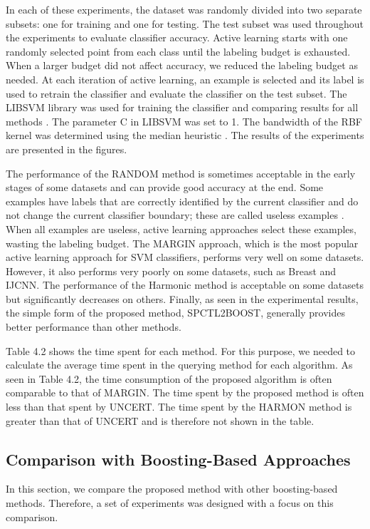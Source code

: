\documentclass[12pt]{article}
\begin{document}
	In each of these experiments, the dataset was randomly divided into two separate subsets: one for training and one for testing. The test subset was used throughout the experiments to evaluate classifier accuracy. Active learning starts with one randomly selected point from each class until the labeling budget is exhausted. When a larger budget did not affect accuracy, we reduced the labeling budget as needed. At each iteration of active learning, an example is selected and its label is used to retrain the classifier and evaluate the classifier on the test subset. The LIBSVM library was used for training the classifier and comparing results for all methods \cite{chang2011libsvm}. The parameter C in LIBSVM was set to 1. The bandwidth of the RBF kernel was determined using the median heuristic \cite{gretton2012kernel}. The results of the experiments are presented in the figures.
	
	The performance of the RANDOM method is sometimes acceptable in the early stages of some datasets and can provide good accuracy at the end. Some examples have labels that are correctly identified by the current classifier and do not change the current classifier boundary; these are called useless examples \cite{hospedales2010finding}. When all examples are useless, active learning approaches select these examples, wasting the labeling budget. The MARGIN approach, which is the most popular active learning approach for SVM classifiers, performs very well on some datasets. However, it also performs very poorly on some datasets, such as Breast and IJCNN. The performance of the Harmonic method is acceptable on some datasets but significantly decreases on others. Finally, as seen in the experimental results, the simple form of the proposed method, SPCTL2BOOST, generally provides better performance than other methods.
	
	Table 4.2 shows the time spent for each method. For this purpose, we needed to calculate the average time spent in the querying method for each algorithm. As seen in Table 4.2, the time consumption of the proposed algorithm is often comparable to that of MARGIN. The time spent by the proposed method is often less than that spent by UNCERT. The time spent by the HARMON method is greater than that of UNCERT and is therefore not shown in the table.
	
	\subsection{Comparison with Boosting-Based Approaches}
	In this section, we compare the proposed method with other boosting-based methods. Therefore, a set of experiments was designed with a focus on this comparison.
	
\end{document}
